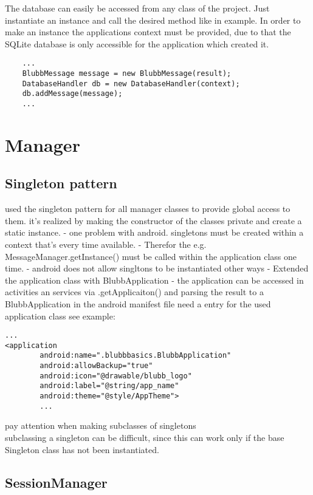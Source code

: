 \documentclass[12pt,a4paper,oneside]{report}
\begin{document}
The database can easily be accessed from any class of the project. Just instantiate an instance and call the desired method like in example. In order to make an instance the applications context must be provided, due to that the SQLite database is only accessible for the application which created it.
\begin{lstlisting}
	...
	BlubbMessage message = new BlubbMessage(result);
	DatabaseHandler db = new DatabaseHandler(context);
	db.addMessage(message);
	...
\end{lstlisting}


\section{Manager}

\subsection{Singleton pattern}
used the singleton pattern for all manager classes to provide global access to them. it's realized by making the constructor of the classes private and create a static instance. 
\citep[p. 39]{cooper2000java}
- one problem with android. singletons must be created within a context that's every time available.
- Therefor the e.g. MessageManager.getInstance() must be called within the application class one time. 
- android does not allow singltons to be instantiated other ways 
- Extended the application class with BlubbApplication
- the application can be accessed in activities an services via .getApplicaiton() and parsing the result to a BlubbApplication
in the android manifest file need a entry for the used application class see example:

\lstset{language=xml}
\begin{lstlisting}
...
<application
        android:name=".blubbbasics.BlubbApplication"
        android:allowBackup="true"
        android:icon="@drawable/blubb_logo"
        android:label="@string/app_name"
        android:theme="@style/AppTheme">
        ...
\end{lstlisting}
\lstset{language=java}
pay attention when making subclasses of singletons
\\subclassing a singleton can be difficult, since this can work only if the base Singleton class has not been instantiated. \citep[p. 46]{cooper2000java} 


\subsection{SessionManager}
\end{document}
